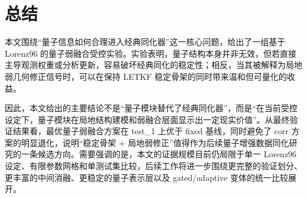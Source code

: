 \section{总结}
本文围绕“量子信息如何合理进入经典同化器”这一核心问题，给出了一组基于 Lorenz96 的量子弱融合受控实验。实验表明，量子结构本身并非无效，但若直接主导观测权重或分析更新，容易破坏经典同化的稳定性；相反，当其被解释为局地弱几何修正信号时，可以在保持 LETKF 稳定骨架的同时带来温和但可量化的收益。

因此，本文给出的主要结论不是“量子模块替代了经典同化器”，而是“在当前受控设定下，量子模块在局地结构建模和弱融合层面显示出一定现实价值”。从最终验证结果看，最优量子弱融合方案在 test\_1 上优于 fixed 基线，同时避免了 corr 方案的明显退化，说明“稳定骨架 + 局地弱修正”值得作为后续量子增强数据同化研究的一条候选方向。需要强调的是，本文的证据规模目前仍局限于单一 Lorenz96 设定、有限参数网格和单测试集比较，后续工作将进一步围绕更完整的验证划分、更丰富的中间消融、更稳定的量子表示层以及 gated/adaptive 变体的统一比较展开。
